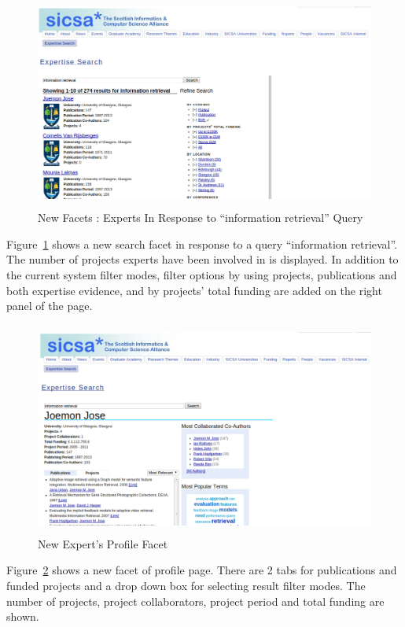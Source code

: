 \begin{figure}
 \centering
 \includegraphics[width=13cm,height=7cm,keepaspectratio]{./figures/newsearch.png}
 \caption{New Facets : Experts In Response to ``information retrieval'' Query} \label{fig:newsearch} 
 \end{figure}
 Figure~\ref{fig:newsearch} shows a new search facet in response to a query ``information retrieval''. The number of 
projects experts have been involved in is displayed. In addition to the current system filter modes, filter options by using projects, publications and both
expertise evidence, and by projects' total funding are added on the right panel of the page.

 \begin{figure}
 \centering
 \includegraphics[width=13cm,height=7cm,keepaspectratio]{./figures/newProfilePagePublication.png}
 \caption{New Expert's Profile Facet} \label{fig:newProfilePage} 
 \end{figure}
 Figure~\ref{fig:newProfilePage} shows a new facet of profile page. There are 2 tabs for publications and funded projects and a drop down box for selecting
 result filter modes. The number of projects, project collaborators, project period and total funding are shown.
 
